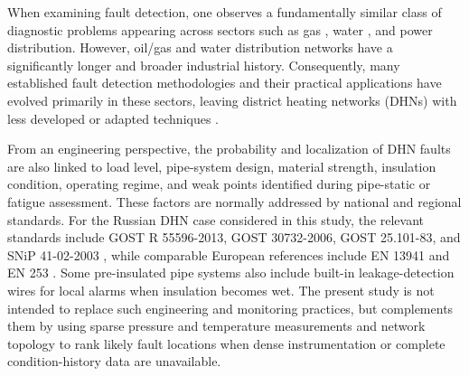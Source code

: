 \documentclass[energies,article,submit,pdftex,moreauthors]{Definitions/mdpi}
\newif\ifshowrevisions
\newcommand{\revisionstyle}[1]{\textcolor{blue}{#1}}
\newcommand{\revision}[1]{\ifshowrevisions\revisionstyle{#1}\else#1\fi}
\begin{document}
When examining fault detection, one observes a fundamentally similar class of
diagnostic problems appearing across sectors such as gas \cite{LI2023124170},
water \cite{guan2022automatic}, and power \cite{hojabri2023ml} distribution.
However, oil/gas and water distribution networks have a significantly longer
and broader industrial history. Consequently, many established
fault detection methodologies and their practical
applications have evolved primarily in these sectors, leaving district heating
networks (DHNs) with less developed or adapted techniques \cite{ZHOU2018567}.


From an engineering perspective, the probability and localization of DHN faults are also linked to load level, pipe-system design, material strength, insulation condition, operating regime, and weak points identified during pipe-static or fatigue assessment. These factors are normally addressed by national and regional standards. For the Russian DHN case considered in this study, the relevant standards include GOST R 55596-2013, GOST 30732-2006, GOST 25.101-83, and SNiP 41-02-2003 \cite{gost55596_2013,gost30732_2006,gost25101_1983,snip4102_2003}, while comparable European references include EN 13941 and EN 253 \cite{en13941_2021,en253_2023}. Some pre-insulated pipe systems also include built-in leakage-detection wires for local alarms when insulation becomes wet. The present study is not intended to replace such engineering and monitoring practices, but complements them by using sparse pressure and temperature measurements and network topology to rank likely fault locations when dense instrumentation or complete condition-history data are unavailable.
\end{document}

